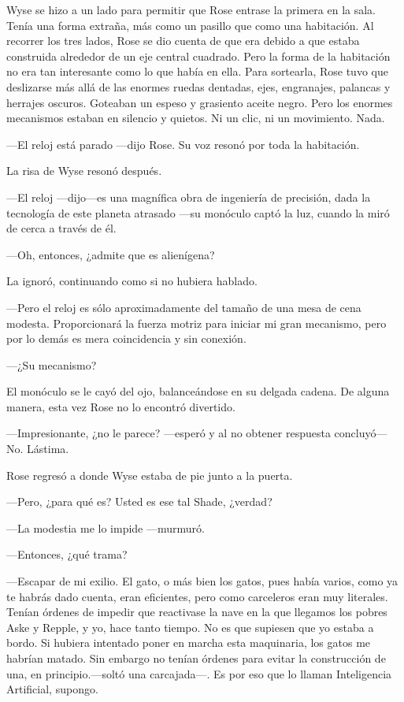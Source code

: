 {Wyse se hizo a un lado para permitir que Rose entrase la primera en la
	sala. Tenía una forma extraña, más como un pasillo que como una
	habitación. Al recorrer los tres lados, Rose se dio cuenta de que era
	debido a que estaba construida alrededor de un eje central cuadrado.
	Pero la forma de la habitación no era tan interesante como lo que había
	en ella. Para sortearla, Rose tuvo que deslizarse más allá de las
	enormes ruedas dentadas, ejes, engranajes, palancas y herrajes oscuros.
	Goteaban un espeso y grasiento aceite negro. Pero los enormes mecanismos
estaban en silencio y quietos. Ni un clic, ni un movimiento. Nada.}

{---El reloj está parado ---dijo Rose. Su voz resonó por toda la
habitación.}

{La risa de Wyse resonó después.}

{---El reloj ---dijo---es una magnífica obra de ingeniería de precisión,
	dada la tecnología de este planeta atrasado ---su monóculo captó la luz,
cuando la miró de cerca a través de él.}

{---Oh, entonces, ¿admite que es alienígena?}

{La ignoró, continuando como si no hubiera hablado.}

{---Pero el reloj es sólo aproximadamente del tamaño de una mesa de cena
	modesta. Proporcionará la fuerza motriz para iniciar mi gran mecanismo,
pero por lo demás es mera coincidencia y sin conexión.}

{---¿Su mecanismo?}

{El monóculo se le cayó del ojo, balanceándose en su delgada cadena. De
alguna manera, esta vez Rose no lo encontró divertido.}

{---Impresionante, ¿no le parece? ---esperó y al no obtener respuesta
concluyó--- No. Lástima.}

{Rose regresó a donde Wyse estaba de pie junto a la puerta.}

{---Pero, ¿para qué es? Usted es ese tal Shade, ¿verdad?}

{---La modestia me lo impide ---murmuró.}

{---Entonces, ¿qué trama?}

{---Escapar de mi exilio. El gato, o más bien los gatos, pues había
	varios, como ya te habrás dado cuenta, eran eficientes, pero como
	carceleros eran muy literales. Tenían órdenes de impedir que reactivase
	la nave en la que llegamos los pobres Aske y Repple, y yo, hace tanto
	tiempo. No es que supiesen que yo estaba a bordo. Si hubiera intentado
	poner en marcha esta maquinaria, los gatos me habrían matado. Sin
	embargo no tenían órdenes para evitar la construcción de una, en
	principio.---soltó una carcajada---. Es por eso que lo llaman
Inteligencia Artificial, supongo.}

